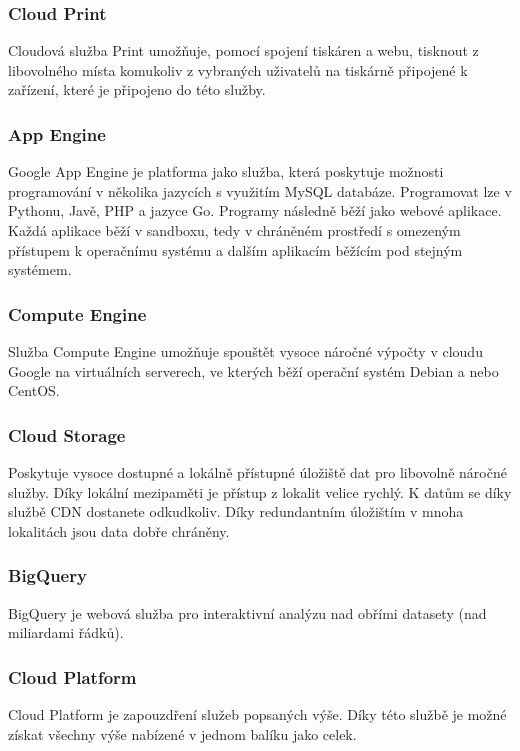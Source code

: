 \subsubsection{Cloud Print}
Cloudová služba Print umožňuje, pomocí spojení tiskáren a webu, tisknout z libovolného místa komukoliv z vybraných uživatelů na tiskárně připojené k zařízení, které je připojeno do této služby.

\subsubsection{App Engine}
\label{sec:googleAppEngine}
Google App Engine je platforma jako služba, která poskytuje možnosti programování v několika jazycích s využitím MySQL databáze. Programovat lze v Pythonu, Javě, PHP a jazyce Go. Programy následně běží jako webové aplikace. Každá aplikace běží v sandboxu, tedy v chráněném prostředí s omezeným přístupem k operačnímu systému a dalším aplikacím běžícím pod stejným systémem.

\subsubsection{Compute Engine}
Služba Compute Engine umožňuje spouštět vysoce náročné výpočty v cloudu Google na virtuálních serverech, ve kterých běží operační systém Debian a nebo CentOS.

\subsubsection{Cloud Storage}
Poskytuje vysoce dostupné a lokálně přístupné úložiště dat pro libovolně náročné služby. Díky lokální mezipaměti je přístup z lokalit velice rychlý. K datům se díky službě CDN dostanete odkudkoliv. Díky redundantním úložištím v mnoha lokalitách jsou data dobře chráněny.

\subsubsection{BigQuery}
BigQuery je webová služba pro interaktivní analýzu nad obřími datasety (nad miliardami řádků).

\subsubsection{Cloud Platform}
Cloud Platform je zapouzdření služeb popsaných výše. Díky této službě je možné získat všechny výše nabízené v jednom balíku jako celek.

